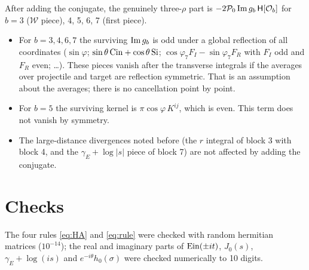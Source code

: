 \documentclass[10pt]{article}
\numberwithin{equation}{section}
\begin{document}
After adding the conjugate, the genuinely three-$\rho$ part is $-2\mathcal{P}_{0}\,{\rm Im}\,g_{b}\,\mathsf{H}[\mathcal{O}_{b}]$ for $b=3$ ($\mathcal{W}$ piece), 4, 5, 6, 7 (first piece).
\begin{itemize}
\item For $b=3,4,6,7$ the surviving ${\rm Im}\,g_{b}$ is odd under a global reflection of all coordinates ($\sin\varphi$; $\sin\theta\,{\rm Cin}+\cos\theta\,{\rm Si}$; $\cos\varphi_{7}F_{I}-\sin\varphi_{7}F_{R}$ with $F_{I}$ odd and $F_{R}$ even; \dots). These pieces vanish after the transverse integrals if the averages over projectile and target are reflection symmetric. That is an assumption about the averages; there is no cancellation point by point.
\item For $b=5$ the surviving kernel is $\pi\cos\varphi\,K^{ij}$, which is even. This term does not vanish by symmetry.
\item The large-distance divergences noted before (the $r$ integral of block 3 with block 4, and the $\gamma_{E}+\log|s|$ piece of block 7) are not affected by adding the conjugate.
\end{itemize}

\section*{Checks}
The four rules \eqref{eq:HA} and \eqref{eq:rule} were checked with random hermitian matrices ($10^{-14}$); the real and imaginary parts of ${\rm Ein}(\pm it)$, $J_{0}(s)$, $\gamma_{E}+\log(is)$ and $e^{-i\theta}h_{0}(\sigma)$ were checked numerically to 10 digits.
\end{document}
